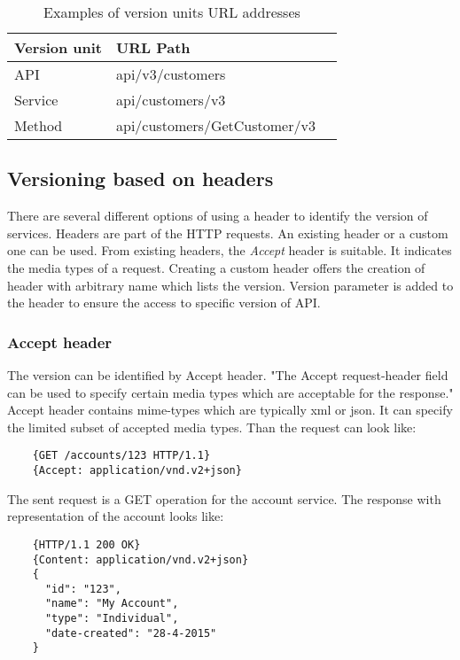 \begin{table}
\caption{Examples of version units URL addresses}
\begin{center}
\begin{tabular}{l l l}
Version unit & URL Path  \\ \hline
API & api/v3/customers  \\
Service & api/customers/v3  \\
Method & api/customers/GetCustomer/v3  \\

\end{tabular}
\end{center}
\end{table}

\subsection{Versioning based on headers}
There are several different options of using a header to identify the version of services. Headers are part of the HTTP requests. An existing header or a custom one can be used. From existing headers, the \emph{Accept} header is suitable. It indicates the media types of a request. Creating a custom header offers the creation of header with arbitrary name which lists the version. Version parameter is added to the header to ensure the access to specific version of API.

\subsubsection{Accept header}
The version can be identified by Accept header. "The Accept request-header field can be used to specify certain media types which are acceptable for the response." \cite{website:w3} Accept header contains \gls{mime-types} which are typically \gls{xml} or \gls{json}. It can specify the limited subset of accepted media types. Than the request can look like:

\begin{lstlisting}
    {GET /accounts/123 HTTP/1.1}
    {Accept: application/vnd.v2+json}
\end{lstlisting}

The sent request is a GET operation for the account service. The response with representation of the account looks like:

\begin{lstlisting}
    {HTTP/1.1 200 OK}
    {Content: application/vnd.v2+json}
    {
      "id": "123",
      "name": "My Account",
      "type": "Individual",
      "date-created": "28-4-2015"
    }       
\end{lstlisting}

